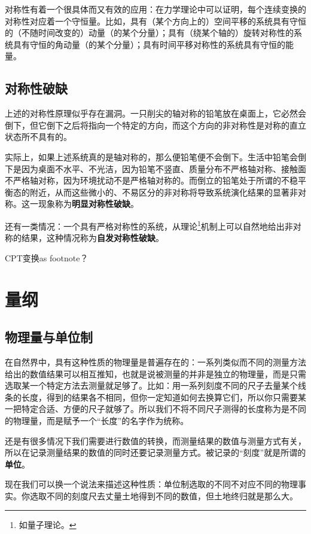 \documentclass[10pt]{article}
\begin{document}
				对称性有着一个很具体而又有效的应用：在力学理论中可以证明，每个连续变换的对称性对应着一个守恒量。比如，具有（某个方向上的）空间平移的系统具有守恒的（不随时间改变的）动量（的某个分量）；具有（绕某个轴的）旋转对称性的系统具有守恒的角动量（的某个分量）；具有时间平移对称性的系统具有守恒的能量。

			\subsection{对称性破缺}
				上述的对称性原理似乎存在漏洞。一只削尖的轴对称的铅笔放在桌面上，它必然会倒下，但它倒下之后将指向一个特定的方向，而这个方向的非对称性是对称的直立状态所不具有的。

				实际上，如果上述系统真的是轴对称的，那么便铅笔便不会倒下。生活中铅笔会倒下是因为桌面不水平、不光洁，因为铅笔不竖直、质量分布不严格轴对称、接触面不严格轴对称，因为环境扰动不是严格轴对称的。而倒立的铅笔处于所谓的不稳平衡态的附近，从而这些微小的、不易区分的非对称将导致系统演化结果的显著非对称。这一现象称为\textbf{明显对称性破缺}。

				还有一类情况：一个具有严格对称性的系统，从理论\footnote{如量子理论。}机制上可以自然地给出非对称的结果，这种情况称为\textbf{自发对称性破缺}。

				CPT变换as footnote？

		\section{量纲}
			\subsection{物理量与单位制}
				在自然界中，具有这种性质的物理量是普遍存在的：一系列类似而不同的测量方法给出的数值结果可以相互推知，也就是说被测量的并非是独立的物理量，而是只需选取某一个特定方法去测量就足够了。比如：用一系列刻度不同的尺子去量某个线条的长度，得到的结果各不相同，但你一定知道如何去换算它们，所以你只需要某一把特定合适、方便的尺子就够了。所以我们不将不同尺子测得的长度称为是不同的物理量，而是赋予一个“长度”的名字作为统称。

				
				还是有很多情况下我们需要进行数值的转换，而测量结果的数值与测量方式有关，所以在记录测量结果的数值的同时还要记录测量方式。被记录的“刻度”就是所谓的\textbf{单位}。

				现在我们可以换一个说法来描述这种性质：单位制选取的不同不对应不同的物理事实。你选取不同的刻度尺去丈量土地得到不同的数值，但土地终归就是那么大。
			
\end{document}
